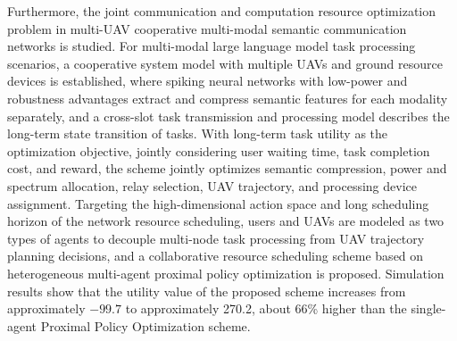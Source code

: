 \begin{enabstract}
Furthermore, the joint communication and computation resource optimization problem in multi-UAV cooperative multi-modal semantic communication networks is studied. For multi-modal large language model task processing scenarios, a cooperative system model with multiple UAVs and ground resource devices is established, where spiking neural networks with low-power and robustness advantages extract and compress semantic features for each modality separately, and a cross-slot task transmission and processing model describes the long-term state transition of tasks. With long-term task utility as the optimization objective, jointly considering user waiting time, task completion cost, and reward, the scheme jointly optimizes semantic compression, power and spectrum allocation, relay selection, UAV trajectory, and processing device assignment. Targeting the high-dimensional action space and long scheduling horizon of the network resource scheduling, users and UAVs are modeled as two types of agents to decouple multi-node task processing from UAV trajectory planning decisions, and a collaborative resource scheduling scheme based on heterogeneous multi-agent proximal policy optimization is proposed. Simulation results show that the utility value of the proposed scheme increases from approximately $-99.7$ to approximately 270.2, about 66\% higher than the single-agent Proximal Policy Optimization scheme.
\end{enabstract}

